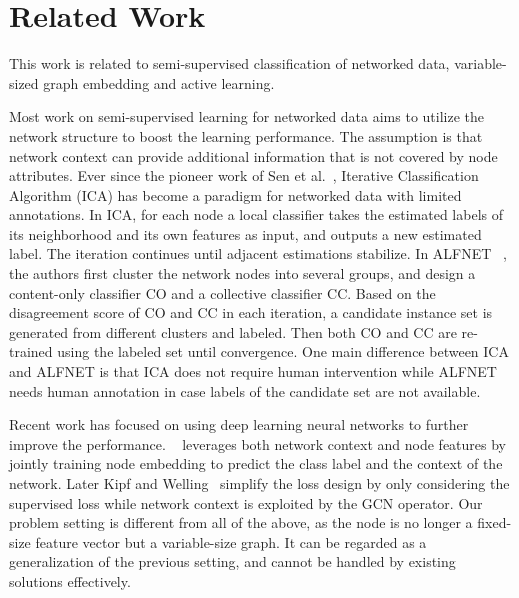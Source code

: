 \documentclass[sigconf]{acmart}
\newcommand{\eat}[1]{}
\begin{document}
\section{Related Work}\label{sec.related}
This work is related to semi-supervised classification of networked data, variable-sized graph embedding and active learning.

Most work on semi-supervised learning for networked data aims to utilize the network structure to boost the learning performance.  The assumption is that network context can provide additional information that is not covered by node attributes.  Ever since the pioneer work of Sen et al.\ \cite{sen2008collective}, Iterative Classification Algorithm (ICA) has become a paradigm for networked data with limited annotations.  In ICA, for each node a local classifier takes the estimated labels of its neighborhood and its own features as input, and outputs a new estimated label.  The iteration continues until adjacent estimations stabilize.  In ALFNET ~\cite{bilgic2010active}, the authors first cluster the network nodes into several groups, and design a content-only classifier CO and a collective classifier CC.  Based on the disagreement score of CO and CC in each iteration, a candidate instance set is generated from different clusters and labeled.  Then both CO and CC are re-trained using the labeled set until convergence.  One main difference between ICA and ALFNET is that ICA does not require human intervention while ALFNET needs human annotation in case labels of the candidate set are not available. \eat{This is an active learning method and it is worthwhile here since the number of samples to be labeled is small compared with the total number of samples.}

Recent work has focused on using deep learning neural networks to further improve the performance. ~\cite{yang2016revisiting} leverages both network context and node features by jointly training node embedding to predict the class label and the context of the network.  Later Kipf and Welling~\cite{kipf2017semi} simplify the loss design by only considering the supervised loss while network context is exploited by the GCN operator.  Our problem setting is different from all of the above, as the node is no longer a fixed-size feature vector but a variable-size graph.  It can be regarded as a generalization of the previous setting, and cannot be handled by existing solutions effectively.  
\end{document}
